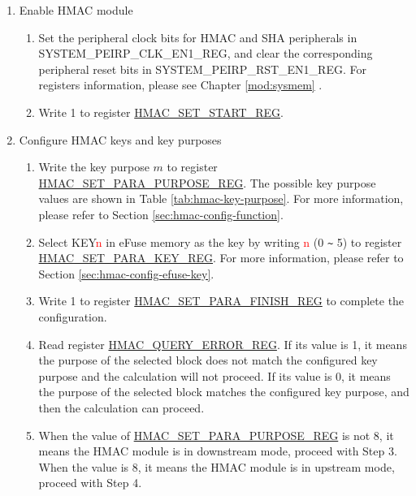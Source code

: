 \documentclass[main\_\_EN.tex]{subfiles}
\begin{document}
\begin{enumerate}
    \item Enable HMAC module
    \begin{enumerate}
        \item Set the peripheral clock bits for HMAC and SHA peripherals in SYSTEM\_PEIRP\_CLK\_EN1\_REG, and clear the corresponding peripheral reset bits in SYSTEM\_PEIRP\_RST\_EN1\_REG. For registers information, please see Chapter \ref{mod:sysmem} \textit{}.
        \item Write 1 to register \hyperref[regdesc:HMACSETSTARTREG]{HMAC\_SET\_START\_REG}.
    \end{enumerate}

    \item Configure HMAC keys and key purposes
    \begin{enumerate}
        \item Write the key purpose $m$ to register \hyperref[regdesc:HMACSETPARAPURPOSEREG]{HMAC\_SET\_PARA\_PURPOSE\_REG}. The possible key purpose values are shown in Table \ref{tab:hmac-key-purpose}. For more information, please refer to Section \ref{sec:hmac-config-function}.
        \item Select KEY\textcolor{red}{n} in eFuse memory as the key by writing \textcolor{red}{n} (0 \verb+~+ 5) to register \hyperref[regdesc:HMACSETPARAKEYREG]{HMAC\_SET\_PARA\_KEY\_REG}. For more information, please refer to Section \ref{sec:hmac-config-efuse-key}.
        \item Write 1 to register \hyperref[regdesc:HMACSETPARAFINISHREG]{HMAC\_SET\_PARA\_FINISH\_REG} to complete the configuration.
        \item Read register \hyperref[regdesc:HMACQUERYERRORREG]{HMAC\_QUERY\_ERROR\_REG}. If its value is 1, it means the purpose of the selected block does not match the configured key purpose and the calculation will not proceed. If its value is 0, it means the purpose of the selected block matches the configured key purpose, and then the calculation can proceed.
        \item When the value of \hyperref[regdesc:HMACSETPARAPURPOSEREG]{HMAC\_SET\_PARA\_PURPOSE\_REG} is not 8, it means the HMAC module is in downstream mode, proceed with Step 3. When the value is 8, it means the HMAC module is in upstream mode, proceed with Step 4.
    \end{enumerate}


\end{enumerate}
\end{document}
